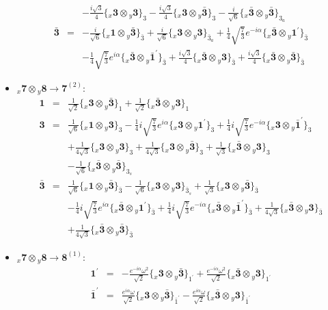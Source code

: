 \documentclass[english]{article}
\newcommand{\rep}[1]{\mathbf{#1}}
\newcommand{\repx}[2]{{}_{#2}\mathbf{#1}}
\newcommand{\subcg}[3]{\big\{ \repx{#1}{x}\otimes\repx{#2}{y}\big\}^{}_{#3}}
\begin{document}
\begin{itemize}
\begin{eqnarray*}
 & & -\frac{i \sqrt{3}}{4}\subcg{3}{3}{3}-\frac{i \sqrt{3}}{4}\subcg{3}{\bar{3}}{3}-\frac{i}{\sqrt{6}}\subcg{\bar{3}}{\bar{3}}{3_{a}}
\\
\rep{\bar{3}} &=& -\frac{i}{\sqrt{6}}\subcg{1}{\bar{3}}{\bar{3}}+\frac{i}{\sqrt{6}}\subcg{3}{3}{\bar{3}_{a}}+\frac{1}{4} \sqrt{\frac{7}{3}} e^{-i \alpha }\subcg{\bar{3}}{1^{\prime}}{\bar{3}} \\ 
 & & -\frac{1}{4} \sqrt{\frac{7}{3}} e^{i \alpha }\subcg{\bar{3}}{\bar{1}^{\prime}}{\bar{3}}+\frac{i \sqrt{3}}{4}\subcg{\bar{3}}{3}{\bar{3}}+\frac{i \sqrt{3}}{4}\subcg{\bar{3}}{\bar{3}}{\bar{3}}
\end{eqnarray*}
\item $\repx{7}{x}\otimes\repx{8}{y}\to\rep{7}^{(2)}$:
\begin{eqnarray*}
\rep{1} &=& \frac{1}{\sqrt{2}}\subcg{3}{\bar{3}}{1}+\frac{1}{\sqrt{2}}\subcg{\bar{3}}{3}{1}
\\
\rep{3} &=& \frac{1}{\sqrt{6}}\subcg{1}{3}{3}-\frac{1}{4} i \sqrt{\frac{7}{3}} e^{i \alpha }\subcg{3}{1^{\prime}}{3}+\frac{1}{4} i \sqrt{\frac{7}{3}} e^{-i \alpha }\subcg{3}{\bar{1}^{\prime}}{3} \\ 
 & & +\frac{1}{4 \sqrt{3}}\subcg{3}{3}{3}+\frac{1}{4 \sqrt{3}}\subcg{3}{\bar{3}}{3}+\frac{1}{\sqrt{3}}\subcg{\bar{3}}{3}{3} \\ 
 & & -\frac{1}{\sqrt{6}}\subcg{\bar{3}}{\bar{3}}{3_{s}}
\\
\rep{\bar{3}} &=& \frac{1}{\sqrt{6}}\subcg{1}{\bar{3}}{\bar{3}}-\frac{1}{\sqrt{6}}\subcg{3}{3}{\bar{3}_{s}}+\frac{1}{\sqrt{3}}\subcg{3}{\bar{3}}{\bar{3}} \\ 
 & & -\frac{1}{4} i \sqrt{\frac{7}{3}} e^{i \alpha }\subcg{\bar{3}}{1^{\prime}}{\bar{3}}+\frac{1}{4} i \sqrt{\frac{7}{3}} e^{-i \alpha }\subcg{\bar{3}}{\bar{1}^{\prime}}{\bar{3}}+\frac{1}{4 \sqrt{3}}\subcg{\bar{3}}{3}{\bar{3}} \\ 
 & & +\frac{1}{4 \sqrt{3}}\subcg{\bar{3}}{\bar{3}}{\bar{3}}
\end{eqnarray*}
\item $\repx{7}{x}\otimes\repx{8}{y}\to\rep{8}^{(1)}$:
\begin{eqnarray*}
\rep{1^{\prime}} &=& -\frac{e^{-i \alpha } \omega ^2}{\sqrt{2}}\subcg{3}{\bar{3}}{1^{\prime}}+\frac{e^{-i \alpha } \omega ^2}{\sqrt{2}}\subcg{\bar{3}}{3}{1^{\prime}}
\\
\rep{\bar{1}^{\prime}} &=& \frac{e^{i \alpha } \omega }{\sqrt{2}}\subcg{3}{\bar{3}}{\bar{1}^{\prime}}-\frac{e^{i \alpha } \omega }{\sqrt{2}}\subcg{\bar{3}}{3}{\bar{1}^{\prime}}
\\

\end{eqnarray*}
\end{itemize}
\end{document}
